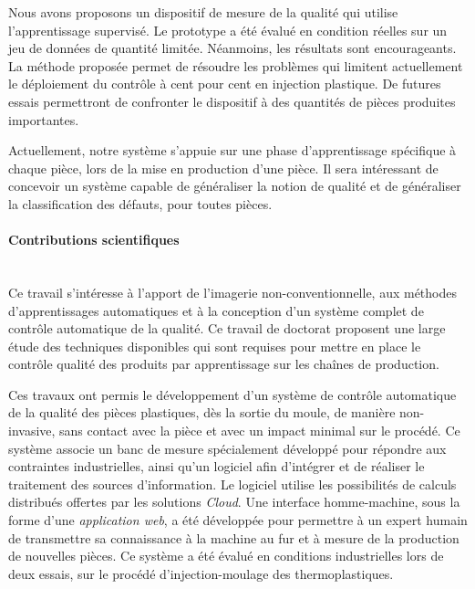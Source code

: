 Nous avons proposons un dispositif de mesure de la qualité qui utilise l’apprentissage supervisé.
Le prototype a été évalué en condition réelles sur un jeu de données de quantité limitée.
Néanmoins, les résultats sont encourageants.
La méthode proposée permet de résoudre les problèmes qui limitent actuellement le déploiement du contrôle à cent pour cent en injection plastique.
De futures essais permettront de confronter le dispositif à des quantités de pièces produites importantes.

Actuellement, notre système s’appuie sur une phase d’apprentissage spécifique à chaque pièce, lors de la mise en production d’une pièce.
Il sera intéressant de concevoir un système capable de généraliser la notion de qualité et de généraliser la classification des défauts, pour toutes pièces.

\bigskip

\bigskip

\paragraph{Contributions scientifiques}\mbox{} \\

Ce travail s'intéresse à l'apport de l'imagerie non-conventionnelle, aux méthodes d'apprentissages automatiques et à la conception d'un système complet de contrôle automatique de la qualité.
Ce travail de doctorat proposent une large étude des techniques disponibles qui sont requises pour mettre en place le contrôle qualité des produits par apprentissage sur les chaînes de production.

Ces travaux ont permis le développement d'un système de contrôle automatique de la qualité des pièces plastiques, dès la sortie du moule, de manière non-invasive, sans contact avec la pièce et avec un impact minimal sur le procédé.
Ce système associe un banc de mesure spécialement développé pour répondre aux contraintes industrielles, ainsi qu'un logiciel afin d'intégrer et de réaliser le traitement des sources d'information.
Le logiciel utilise les possibilités de calculs distribués offertes par les solutions \textit{Cloud}.
Une interface homme-machine, sous la forme d'une \textit{application web}, a été développée pour permettre à un expert humain de transmettre sa connaissance à la machine au fur et à mesure de la production de nouvelles pièces.
Ce système a été évalué en conditions industrielles lors de deux essais, sur le procédé d'injection-moulage des thermoplastiques.

